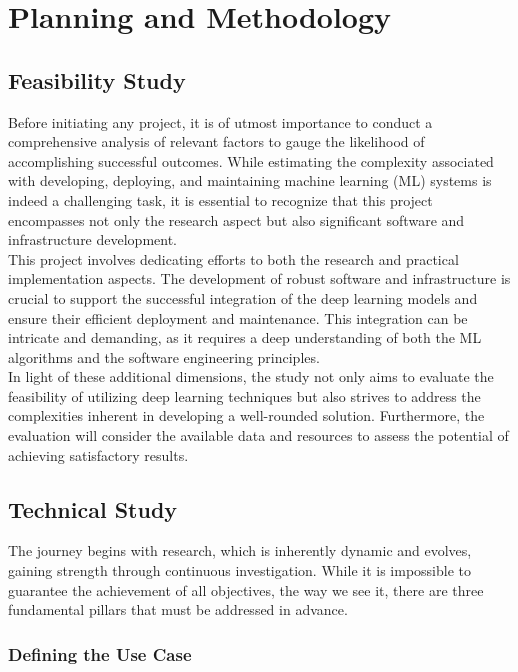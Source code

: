 \chapter{Planning and Methodology}
\label{cap:plan}

\section{Feasibility Study}

Before initiating any project, it is of utmost importance to conduct a
comprehensive analysis of relevant factors to gauge the likelihood of
accomplishing successful outcomes. While estimating the complexity associated
with developing, deploying, and maintaining machine learning (ML) systems is
indeed a challenging task, it is essential to recognize that this project
encompasses not only the research aspect but also significant software and
infrastructure development. \\

This project involves dedicating
efforts to both the research and practical implementation aspects. The
development of robust software and infrastructure is crucial to support the
successful integration of the deep learning models and ensure their efficient
deployment and maintenance. This integration can be intricate and demanding, as
it requires a deep understanding of both the ML algorithms and the software
engineering principles. \\

In light of these additional dimensions, the study not only aims to evaluate
the feasibility of utilizing deep learning techniques but also strives to
address the complexities inherent in developing a well-rounded solution.
Furthermore, the evaluation will consider the available data and resources to
assess the potential of achieving satisfactory results.

\section{Technical Study}

The journey begins with research, which is inherently dynamic and evolves, gaining
strength through continuous investigation. While it is impossible to guarantee
the achievement of all objectives, the way we see it, there are three
fundamental pillars that must be addressed in advance. \\

\subsection{Defining the Use Case}


